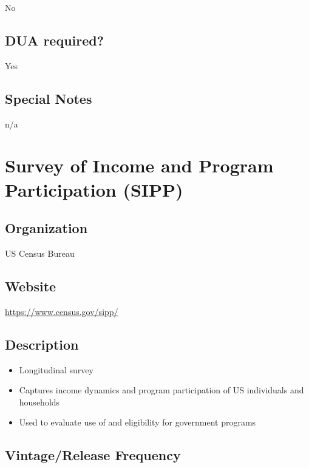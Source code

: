 \documentclass[
]{book}
\providecommand{\tightlist}{%
  \setlength{\itemsep}{0pt}\setlength{\parskip}{0pt}}
\begin{document}
No

\hypertarget{dua-required-87}{%
\section{DUA required?}\label{dua-required-87}}

Yes

\hypertarget{special-notes-87}{%
\section{Special Notes}\label{special-notes-87}}

n/a

\mainmatter

\hypertarget{survey-of-income-and-program-participation-sipp}{%
\chapter{Survey of Income and Program Participation (SIPP)}\label{survey-of-income-and-program-participation-sipp}}

\hypertarget{organization-88}{%
\section{Organization}\label{organization-88}}

US Census Bureau

\hypertarget{website-88}{%
\section{Website}\label{website-88}}

\url{https://www.census.gov/sipp/}

\hypertarget{description-88}{%
\section{Description}\label{description-88}}

\begin{itemize}
\tightlist
\item
  Longitudinal survey
\item
  Captures income dynamics and program participation of US individuals and households
\item
  Used to evaluate use of and eligibility for government programs
\end{itemize}

\hypertarget{vintagerelease-frequency-88}{%
\section{Vintage/Release Frequency}\label{vintagerelease-frequency-88}}
\end{document}
